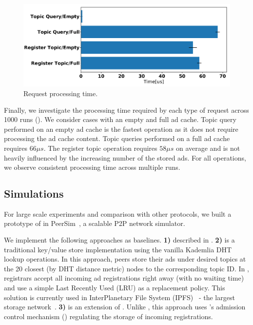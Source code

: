 
\begin{figure}
\centering
\includegraphics[width=\linewidth]{results/testbed/op_time.pdf}
\caption{Request processing time.}
\label{fig:op_time}
\vspace{-0.15in}
\end{figure}

Finally, we investigate the processing time required by each type of request across 1000 runs (). We consider cases with an empty and full ad cache. Topic query performed on an empty ad cache is the fastest operation as it does not require processing the ad cache content. Topic queries performed on a full ad cache requires $66\mu s$. The register topic operation requires $58\mu s$ on average and is not heavily influenced by the increasing number of the stored ads.
For all operations, we observe consistent processing time across multiple runs. 

\vspace{-2mm}
\subsection{Simulations}
\vspace{-2mm}

For large scale experiments and comparison with other protocols, we built a prototype of \sysname in PeerSim~\cite{p2p09-peersim}, a scalable P2P network simulator. %

We implement the following approaches as baselines. \textbf{1) \discv} described in . \textbf{2) \altname} is a traditional key/value store implementation using the vanilla Kademlia DHT lookup operations.  In this approach, peers store their ads under desired topics at the 20 closest (by DHT distance metric) nodes to the corresponding topic ID. In \altname, registrars accept all incoming ad registrations right away (\ie with no waiting time) and use a simple Last Recently Used (LRU) as a replacement policy. This solution is currently used in InterPlanetary File System (IPFS)~\cite{} - the largest storage network~\cite{libp2p_kaddht}. \textbf{3) \altnameticket} is an extension of \altname. Unlike \altname, this approach uses \sysname's admission control mechanism () regulating the storage of incoming registrations. 

